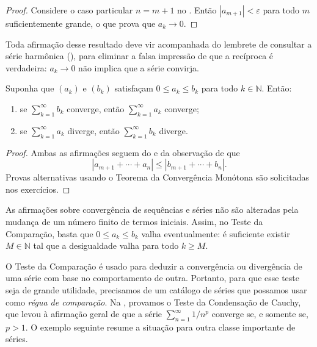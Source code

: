 \begin{proof}
Considere o caso particular $n=m+1$ no . Então $|a_{m+1}|<\varepsilon$ para todo $m$ suficientemente grande, o que prova que $a_k\to0$.
\end{proof}

Toda afirmação desse resultado deve vir acompanhada do lembrete de consultar a série harmônica (), para eliminar a falsa impressão de que a recíproca é verdadeira: $a_k\to0$ não implica que a série convirja.

\begin{theorem}\label{thm:teste-comparacao}
Suponha que $(a_k)$ e $(b_k)$ satisfaçam $0\leq a_k\leq b_k$ para todo $k\in\mathbb{N}$. Então:
\begin{enumerate}[label=(\roman*)]
\item se $\sum_{k=1}^{\infty}b_k$ converge, então $\sum_{k=1}^{\infty}a_k$ converge;
\item se $\sum_{k=1}^{\infty}a_k$ diverge, então $\sum_{k=1}^{\infty}b_k$ diverge.
\end{enumerate}
\end{theorem}

\begin{proof}
Ambas as afirmações seguem do  e da observação de que
\[
\left|a_{m+1}+\cdots+a_n\right|\leq\left|b_{m+1}+\cdots+b_n\right|.
\]
Provas alternativas usando o Teorema da Convergência Monótona são solicitadas nos exercícios.
\end{proof}

As afirmações sobre convergência de sequências e séries não são alteradas pela mudança de um número finito de termos iniciais. Assim, no Teste da Comparação, basta que $0\leq a_k\leq b_k$ valha eventualmente: é suficiente existir $M\in\mathbb{N}$ tal que a desigualdade valha para todo $k\geq M$.

O Teste da Comparação é usado para deduzir a convergência ou divergência de uma série com base no comportamento de outra. Portanto, para que esse teste seja de grande utilidade, precisamos de um catálogo de séries que possamos usar como \textit{régua de comparação}. Na , provamos o Teste da Condensação de Cauchy, que levou à afirmação geral de que a série $\sum_{n=1}^{\infty}1/n^p$ converge se, e somente se, $p>1$. O exemplo seguinte resume a situação para outra classe importante de séries.

